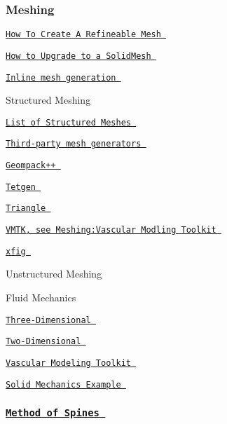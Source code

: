 \subsubsection*{ Meshing }

 
\begin{DoxyItemize}
\item  \href{ ../../poisson/two_d_poisson_adapt/html/index.html }{\tt How To Create A Refineable Mesh }  
\item  \href{ ../../solid/disk_compression/html/index.html#mesh }{\tt How to Upgrade to a Solid\-Mesh }  
\item  \href{ ../../meshes/mesh_from_inline_triangle/html/index.html }{\tt Inline mesh generation }  
\item  Structured Meshing   
\begin{DoxyItemize}
\item  \href{ ../../meshes/mesh_list/html/index.html }{\tt List of Structured Meshes }  
\end{DoxyItemize} 
\item  \href{ ../../meshes/third_party_meshes/html/index.html }{\tt Third-\/party mesh generators }  
\begin{DoxyItemize}
\item  \href{ ../../meshes/mesh_from_geompack/html/index.html }{\tt Geompack++ }  
\item  \href{ ../../meshes/mesh_from_tetgen/html/index.html }{\tt Tetgen }  
\item  \href{ ../../meshes/mesh_from_triangle/html/index.html }{\tt Triangle }  
\item  \href{ ../../index/html/index.html#M.Meshing.VascularModlingToolkit }{\tt V\-M\-T\-K, see Meshing\-:Vascular Modling Toolkit }  
\item  \href{ ../../meshes/mesh_from_xfig/html/index.html }{\tt xfig }  
\end{DoxyItemize}
\item  Unstructured Meshing   
\begin{DoxyItemize}
\item  Fluid Mechanics   
\begin{DoxyItemize}
\item  \href{ ../../navier_stokes/unstructured_three_d_fluid/html/index.html }{\tt Three-\/\-Dimensional }  
\item  \href{ ../../navier_stokes/unstructured_fluid/html/index.html }{\tt Two-\/\-Dimensional }  
\end{DoxyItemize} 
\end{DoxyItemize} 
\item  \href{ ../../meshes/mesh_from_vmtk/html/index.html }{\tt Vascular Modeling Toolkit }  
\begin{DoxyItemize}
\item  \href{ ../../solid/vmtk_solid/html/index.html }{\tt Solid Mechanics Example }  
\end{DoxyItemize}
\end{DoxyItemize} \subsubsection*{ \href{ ../../young_laplace/young_laplace/html/index.html#spines }{\tt Method of Spines } }

